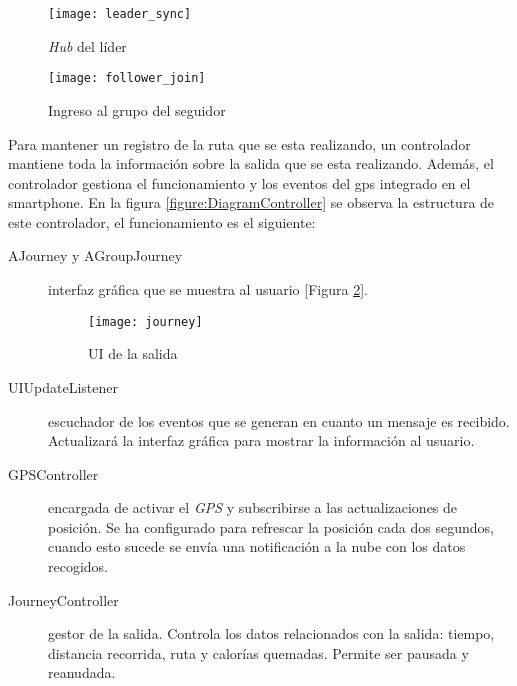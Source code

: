 \begin{figure}[H]
	\begin{minipage}{.5\textwidth}
		\begin{center}
			\texttt{[image: leader\_sync]}
			\caption{\emph{Hub} del líder}
			\label{figure:Hub}
		\end{center}
	\end{minipage}
\begin{minipage}{.5\textwidth}
	\begin{center}
		\texttt{[image: follower\_join]}
		\caption{Ingreso al grupo del seguidor}
		\label{figure:FollowerJoin}
	\end{center}
\end{minipage}
\end{figure}

Para mantener un registro de la ruta que se esta realizando, un controlador mantiene toda la información sobre la salida que se esta realizando. Además, el controlador gestiona el funcionamiento y los eventos del \gls{gps} integrado en el smartphone. En la figura
\ref{figure:DiagramController} se observa la estructura de este controlador, el funcionamiento es el siguiente:
\begin{description}
	\item[AJourney y AGroupJourney] interfaz gráfica que se muestra al usuario
	[Figura \ref{figure:Journey}].

	\begin{figure}[H]
		\begin{center}
			\texttt{[image: journey]}
			\caption{UI de la salida}
			\label{figure:Journey}
		\end{center}
	\end{figure}

	\item[UIUpdateListener] escuchador de los eventos que se generan en cuanto un mensaje es recibido. Actualizará la interfaz gráfica para mostrar la información al usuario.

	\item[GPSController] encargada de activar el \emph{GPS} y subscribirse a las actualizaciones de posición. Se ha configurado para refrescar la posición cada dos segundos, cuando esto sucede se envía una notificación a la nube con los datos recogidos.

	\item[JourneyController] gestor de la salida. Controla los datos relacionados con la salida: tiempo, distancia recorrida, ruta y calorías quemadas. Permite ser pausada y reanudada.
\end{description}

